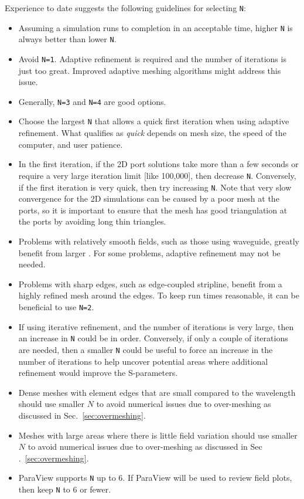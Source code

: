 \documentclass[titlepage]{article}
\renewcommand\_{\textunderscore\linebreak[1]}
\begin{document}
Experience to date suggests the following guidelines for selecting \texttt{N}:
\begin{itemize}
\item Assuming a simulation runs to completion in an acceptable time, higher \texttt{N} is always better than lower \texttt{N}.
\item Avoid \texttt{N=1}.  Adaptive refinement is required and the number of iterations is just too great.  Improved adaptive meshing algorithms might address this issue.
\item Generally, \texttt{N=3} and \texttt{N=4} are good options.
\item Choose the largest \texttt{N} that allows a quick first iteration when using adaptive refinement.  What qualifies as \textit{quick} depends on mesh size, the speed of the computer, and user patience.
\item In the first iteration, if the 2D port solutions take more than a few seconds or require a very large iteration limit [like 100,000], then decrease \texttt{N}.  Conversely, if the first iteration is very quick, then try increasing \texttt{N}.  Note that very slow convergence for the 2D simulations can be caused by a poor mesh at the ports, so it is important to ensure that the mesh has good triangulation at the ports by avoiding long thin triangles.
\item Problems with relatively smooth fields, such as those using waveguide, greatly benefit from larger .  For some problems, adaptive refinement may not be needed.
\item Problems with sharp edges, such as edge-coupled stripline, benefit from a highly refined mesh around the edges.  To keep run times reasonable, it can be beneficial to use \texttt{N=2}.
\item If using iterative refinement, and the number of iterations is very large, then an increase in \texttt{N} could be in order.  Conversely, if only a couple of iterations are needed, then a smaller \texttt{N} could be useful to force an increase in the number of iterations to help uncover potential areas where additional refinement would improve the S-parameters.
\item Dense meshes with element edges that are small compared to the wavelength should use smaller $N$ to avoid numerical issues due to over-meshing as discussed in Sec.~\ref{sec:overmeshing}.
\item Meshes with large areas where there is little field variation should use smaller $N$ to avoid numerical issues due to over-meshing as discussed in Sec
.~\ref{sec:overmeshing}.
\item ParaView supports \texttt{N} up to 6.  If ParaView will be used to review field plots, then keep \texttt{N} to 6 or fewer.
\end{itemize}
\end{document}
